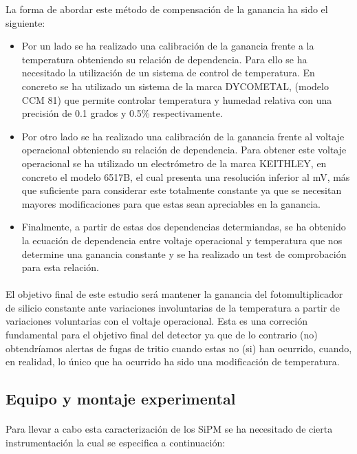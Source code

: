 \documentclass[11pt, a4paper]{article}
\begin{document}
La forma de abordar este método de compensación de la ganancia ha sido el siguiente:
\begin{itemize}
\item {} 
Por un lado se ha realizado una calibración de la ganancia frente a la temperatura obteniendo su relación de dependencia. Para ello se ha necesitado la utilización de un sistema de control de temperatura. En concreto se ha utilizado un sistema de la marca DYCOMETAL, (modelo CCM 81) que permite controlar temperatura y humedad relativa con una precisión de 0.1 grados y  0.5\% respectivamente.

\item {} Por otro lado se ha realizado una calibración de la ganancia frente al voltaje operacional obteniendo su relación de dependencia. Para obtener este voltaje operacional se ha utilizado un electrómetro de la marca KEITHLEY, en concreto el modelo 6517B, el cual presenta una resolución inferior al mV, más que suficiente para considerar este totalmente constante ya que se necesitan mayores modificaciones para que estas sean apreciables en la ganancia.

\item {} Finalmente, a partir de estas dos dependencias determiandas, se ha obtenido la ecuación de dependencia entre voltaje operacional y temperatura que nos determine una ganancia constante  y se ha realizado un test de comprobación para esta relación.
\end{itemize}

\paragraph {}
El objetivo final de este estudio será mantener la ganancia del fotomultiplicador de silicio constante ante variaciones involuntarias de la temperatura a partir de variaciones voluntarias con el voltaje operacional. Esta es una correción fundamental para el objetivo final del detector ya que de lo contrario (no) obtendríamos alertas de fugas de tritio cuando estas no (si) han ocurrido, cuando, en realidad, lo único que ha ocurrido ha sido una modificación de temperatura.

\newpage

\subsection {Equipo y montaje experimental} 
\paragraph {} 
Para llevar a cabo esta caracterización de los SiPM se ha necesitado de cierta instrumentación la cual se especifica a continuación:
\end{document}
